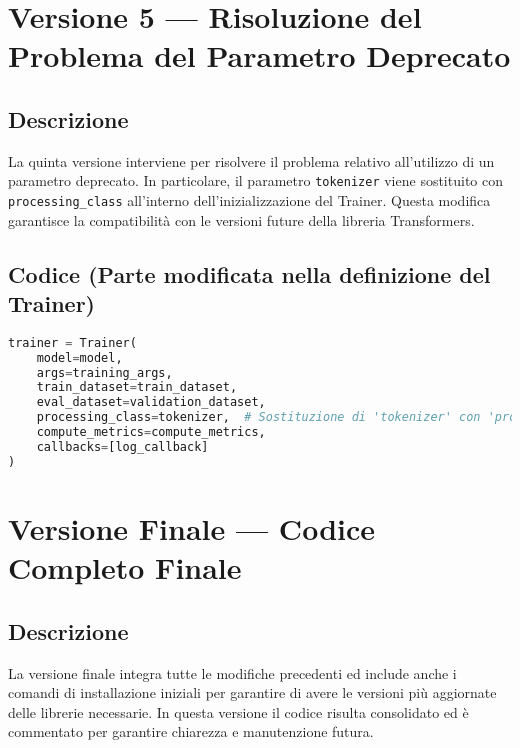\documentclass[a4paper,12pt]{article}
\begin{document}
\section{Versione 5 --- Risoluzione del Problema del Parametro Deprecato}
\subsection*{Descrizione}
La quinta versione interviene per risolvere il problema relativo all'utilizzo di un parametro deprecato. In particolare, il parametro \texttt{tokenizer} viene sostituito con \texttt{processing\_class} all'interno dell'inizializzazione del Trainer.  
Questa modifica garantisce la compatibilità con le versioni future della libreria Transformers.

\subsection*{Codice (Parte modificata nella definizione del Trainer)}
\begin{lstlisting}[language=Python, caption={Versione 5 --- Uso di processing_class}]
trainer = Trainer(
    model=model,
    args=training_args,
    train_dataset=train_dataset,
    eval_dataset=validation_dataset,
    processing_class=tokenizer,  # Sostituzione di 'tokenizer' con 'processing_class'
    compute_metrics=compute_metrics,
    callbacks=[log_callback]
)
\end{lstlisting}

\section{Versione Finale --- Codice Completo Finale}
\subsection*{Descrizione}
La versione finale integra tutte le modifiche precedenti ed include anche i comandi di installazione iniziali per garantire di avere le versioni più aggiornate delle librerie necessarie. In questa versione il codice risulta consolidato ed è commentato per garantire chiarezza e manutenzione futura.
\end{document}
